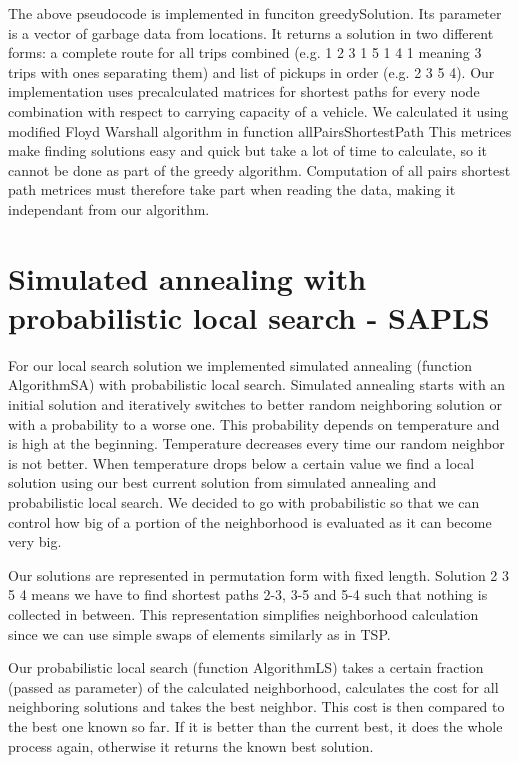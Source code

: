 \documentclass[a4paper, 12pt]{article}
\begin{document}
The above pseudocode is implemented in funciton {\sf greedySolution}. Its
parameter is a vector of garbage data from locations. It returns a solution in
two different forms: a complete route for all trips combined (e.g. 1 2 3 1 5 1
4 1 meaning 3 trips with ones separating them) and list of pickups in order
(e.g. 2 3 5 4). Our implementation uses precalculated matrices for shortest
paths for every node combination with respect to carrying capacity of a
vehicle. We calculated it using modified Floyd Warshall algorithm in function
{\sf allPairsShortestPath} This metrices make finding solutions easy and
quick but take a lot of time to calculate, so it cannot be done as part of the
greedy algorithm. Computation of all pairs shortest path metrices must
therefore take part when reading the data, making it independant from our
algorithm.

\section{Simulated annealing with probabilistic local search - SAPLS}

For our local search solution we implemented simulated annealing (function {\sf
AlgorithmSA}) with probabilistic local search. Simulated annealing starts with
an initial solution and iteratively switches to better random neighboring
solution or with a probability to a worse one. This probability depends on
temperature and is high at the beginning. Temperature decreases every time our
random neighbor is not better. When temperature drops below a certain value we
find a local solution using our best current solution from simulated annealing
and probabilistic local search. We decided to go with probabilistic so that we
can control how big of a portion of the neighborhood is evaluated as it can
become very big.

Our solutions are represented in permutation form with fixed length. Solution
2 3 5 4 means we have to find shortest paths 2-3, 3-5 and 5-4 such that nothing
is collected in between. This representation simplifies neighborhood
calculation since we can use simple swaps of elements similarly as in TSP.

Our probabilistic local search (function {\sf AlgorithmLS}) takes a certain
fraction (passed as parameter) of the calculated neighborhood, calculates
the cost for all neighboring solutions and takes the best neighbor. This cost
is then compared to the best one known so far. If it is better than the current
best, it does the whole process again, otherwise it returns the known best
solution.
\end{document}
